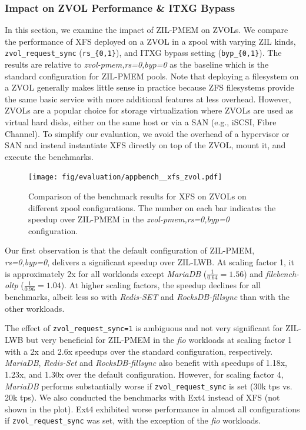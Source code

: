 \documentclass[12pt,a4paper,twoside]{book}
\begin{document}
{\subsubsection{Impact on ZVOL Performance \& ITXG Bypass}\label{sec:eval:zvols_ad_itxg_bypass}

In this section, we examine the impact of ZIL-PMEM on ZVOLs.
We compare the performance of XFS deployed on a ZVOL in a zpool with varying ZIL kinds, \lstinline{zvol_request_sync} (\lstinline|rs_{0,1}|), and ITXG bypass setting (\lstinline|byp_{0,1}|).
The results are relative to \textit{zvol-pmem,rs=0,byp=0} as the baseline which is the standard configuration for ZIL-PMEM pools.
Note that deploying a filesystem on a ZVOL generally makes little sense in practice because ZFS filesystems provide the same basic service with more additional features at less overhead.
However, ZVOLs are a popular choice for storage virtualization where ZVOLs are used as virtual hard disks, either on the same host or via a SAN (e.g., iSCSI, Fibre Channel).
To simplify our evaluation, we avoid the overhead of a hypervisor or SAN and instead instantiate XFS directly on top of the ZVOL, mount it, and execute the benchmarks.

\begin{figure}[H]
    \centering
    \texttt{[image: fig/evaluation/appbench\_\_xfs\_zvol.pdf]}
    \caption{
        Comparison of the benchmark results for XFS on ZVOLs on different zpool configurations.
        The number on each bar indicates the speedup over ZIL-PMEM in the \textit{zvol-pmem,rs=0,byp=0} configuration.
    }
\end{figure}


Our first observation is that the default configuration of ZIL-PMEM, \textit{rs=0,byp=0}, delivers a significant speedup over ZIL-LWB.
At scaling factor 1, it is approximately 2x for all workloads except \textit{MariaDB} ($\frac{1}{0.64} = 1.56$) and \textit{filebench-oltp} ($\frac{1}{0.96} = 1.04$).
At higher scaling factors, the speedup declines for all benchmarks, albeit less so with \textit{Redis-SET} and \textit{RocksDB-fillsync} than with the other workloads.

The effect of \lstinline{zvol_request_sync=1} is ambiguous and not very significant for ZIL-LWB but very beneficial for ZIL-PMEM in the \textit{fio} workloads at scaling factor 1 with a 2x and 2.6x speedups over the standard configuration, respectively.
\textit{MariaDB}, \textit{Redis-Set} and \textit{RocksDB-fillsync} also benefit with speedups of 1.18x, 1.23x, and 1.30x over the default configuration.
However, for scaling factor 4, \textit{MariaDB} performs substantially worse if \lstinline{zvol_request_sync} is set (30k tps vs. 20k tps).
We also conducted the benchmarks with Ext4 instead of XFS (not shown in the plot).
Ext4 exhibited worse performance in almost all configurations if \lstinline{zvol_request_sync} was set, with the exception of the \textit{fio} workloads.

}
\end{document}
